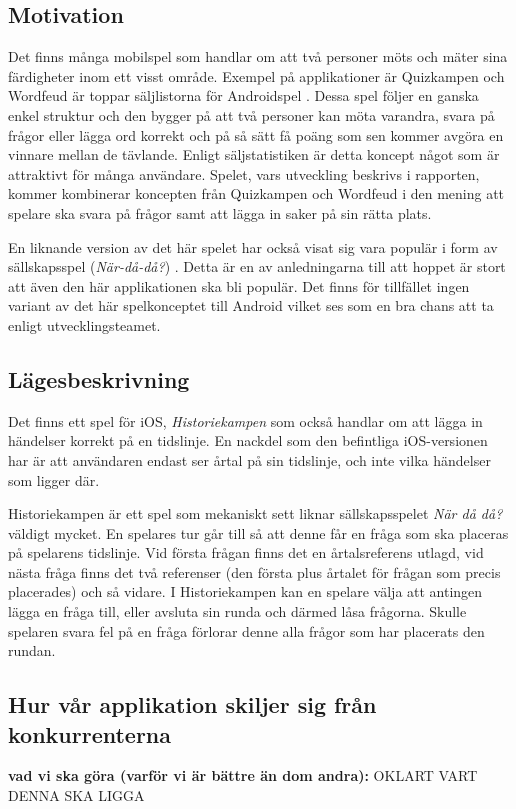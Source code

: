 \documentclass[a4paper, 11pt]{article}
\begin{document}
\subsection{Motivation}
Det finns många mobilspel som handlar om att två personer möts och mäter sina färdigheter inom ett visst område. Exempel på applikationer är Quizkampen och Wordfeud är toppar säljlistorna för Androidspel \cite{appsalesrating}. Dessa spel följer en ganska enkel struktur och den bygger på att två personer kan möta varandra, svara på frågor eller lägga ord korrekt och på så sätt få poäng som sen kommer avgöra en vinnare mellan de tävlande. Enligt säljstatistiken \cite{appsalesrating} är detta koncept något som är attraktivt för många användare. Spelet, vars utveckling beskrivs i rapporten, kommer kombinerar koncepten från Quizkampen och Wordfeud i den mening att spelare ska svara på frågor samt att lägga in saker på sin rätta plats. 

En liknande version av det här spelet har också visat sig vara populär i form av sällskapsspel (\textit{När-då-då?}) \cite{nardada}. Detta är en av anledningarna till att hoppet är stort att även den här applikationen ska bli populär. Det finns för tillfället ingen variant av det här spelkonceptet till Android vilket ses som en bra chans att ta enligt utvecklingsteamet.

\subsection{Lägesbeskrivning}
Det finns ett spel för iOS, \textit{Historiekampen} \cite{historiekampen} som också handlar om att lägga in händelser korrekt på en tidslinje. En nackdel som den befintliga iOS-versionen har är att användaren endast ser årtal på sin tidslinje, och inte vilka händelser som ligger där.

Historiekampen är ett spel som mekaniskt sett liknar sällskapsspelet \textit{När då då?} väldigt mycket. En spelares tur går till så att denne får en fråga som ska placeras på spelarens tidslinje. Vid första frågan finns det en årtalsreferens utlagd, vid nästa fråga finns det två referenser (den första plus årtalet för frågan som precis placerades) och så vidare. I Historiekampen kan en spelare välja att antingen lägga en fråga till, eller avsluta sin runda och därmed låsa frågorna. Skulle spelaren svara fel på en fråga förlorar denne alla frågor som har placerats den rundan.

\subsection{Hur vår applikation skiljer sig från konkurrenterna}
\textbf{vad vi ska göra (varför vi är bättre än dom andra):} 
OKLART VART DENNA SKA LIGGA
\end{document}

